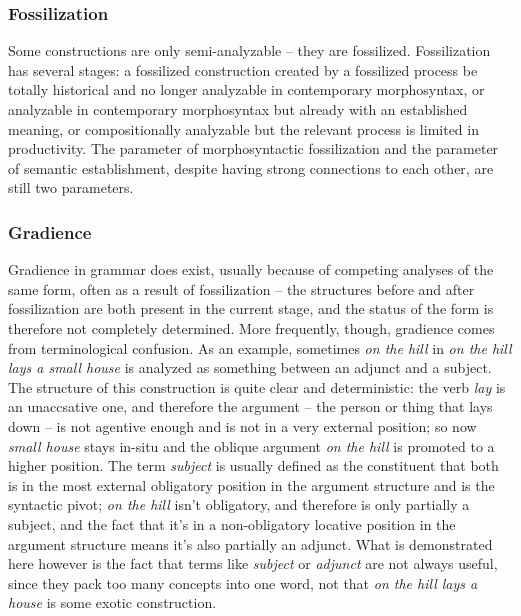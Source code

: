 \documentclass[UTF8, a4paper, oneside, scheme=plain, 12pt]{ctexbook}
\newcommand*{\term}[1]{\emph{#1}}
\newcommand{\form}[1]{\emph{#1}}
\begin{document}
{\subsubsection{Fossilization}

Some constructions are only semi-analyzable -- 
they are fossilized.
Fossilization has several stages:
a fossilized construction created by a fossilized process 
be totally historical and no longer analyzable in contemporary morphosyntax,
or analyzable in contemporary morphosyntax but already with an established meaning,
or compositionally analyzable but the relevant process is limited in productivity.
The parameter of morphosyntactic fossilization 
and the parameter of semantic establishment,
despite having strong connections to each other,
are still two parameters.

\subsubsection{Gradience}

Gradience in grammar does exist, 
usually because of competing analyses of the same form, 
often as a result of fossilization -- 
the structures before and after fossilization are both present 
in the current stage, 
and the status of the form is therefore not completely determined. 
More frequently, though, gradience comes from 
terminological confusion.
As an example, sometimes \form{on the hill} in 
\form{on the hill lays a small house}
is analyzed as something between an adjunct and a subject.
The structure of this construction is quite clear and deterministic:
the verb \form{lay} is an unaccsative one, 
and therefore the argument -- the person or thing that lays down -- 
is not agentive enough and is not in a very external position;
so now \form{small house} stays in-situ 
and the oblique argument \form{on the hill} is promoted to a higher position. 
The term \term{subject} is usually defined as 
the constituent that both is in  
the most external obligatory position in the argument structure 
and is the syntactic pivot; 
\form{on the hill} isn't obligatory, 
and therefore is only partially a subject, 
and the fact that it's in a non-obligatory locative position in the argument structure 
means it's also partially an adjunct. 
What is demonstrated here however is the fact that 
terms like \term{subject} or \term{adjunct} 
are not always useful, since they pack too many concepts into one word, 
not that \form{on the hill lays a house} is some exotic construction.

}
\end{document}
